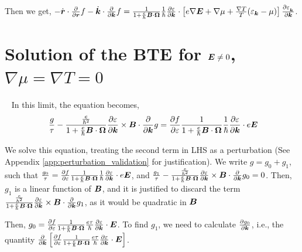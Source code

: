 \documentclass{report}
\renewcommand\vec[1]{\ensuremath\boldsymbol{#1}} %
\begin{document}
Then we get, $-\dot{\vec{r}} \cdot \frac{\partial }{\partial \vec{r}} f - \dot{\vec{k}} \cdot \frac{\partial}{\partial \vec{k}} f = \frac{1}{1 + \frac{e}{\hbar} \vec{B}\cdot\vec{\Omega}} \frac{1}{\hbar} \frac{\partial \varepsilon}{\partial \vec{k}} \cdot \left[e\nabla \vec{E} + \nabla \mu + \frac{\nabla T}{T} (\varepsilon_{\vec{k}} - \mu)\right] \frac{\partial \varepsilon_{_{\vec{k}}}}{\partial \vec{k}}$.


\section{Solution of the BTE for $\vec{E} \neq 0$, $\nabla \mu =  \nabla T = 0$}~\label{app:sec:BTE_sol_nonzeroE}
In this limit, the equation becomes,
\begin{equation}~\label{Eq:app:BTE_zero_chem_pot_thermal_gradient}
	\frac{g}{\tau} -\frac{\frac{e}{\hbar^2} }{1 + \frac{e}{\hbar} \vec{B} \cdot \vec{\Omega}} \frac{\partial \varepsilon}{\partial \vec{k}} \times \vec{B} \cdot\frac{\partial}{\partial \vec{k}} g = \frac{\partial f}{\partial \varepsilon}\frac{1}{1 + \frac{e}{\hbar} \vec{B}\cdot \vec{\Omega}}
	\frac{1}{\hbar} \frac{\partial \varepsilon}{\partial \vec{k}}\cdot e \vec{E}
\end{equation}

We solve this equation, treating the second term in LHS as a perturbation (See Appendix \ref{app:perturbation_validation} for justification).
We write $g = g_0 + g_1$, such that $\frac{g_0}{\tau} = \frac{\partial f}{\partial \varepsilon}\frac{1}{1 + \frac{e}{\hbar} \vec{B}\cdot\vec{\Omega}}
\frac{1}{\hbar} \frac{\partial \varepsilon}{\partial \vec{k}}\cdot e \vec{E}$, and $\frac{g_1}{\tau} -\frac{\frac{e}{\hbar^2} }{1 + \frac{e}{\hbar} \vec{B}\cdot\vec{\Omega}} \frac{\partial \varepsilon}{\partial \vec{k}} \times \vec{B} \cdot\frac{\partial}{\partial \vec{k}} g_0 = 0$.
Then, $g_1$ is a linear function of $\vec{B}$, and it is justified to discard the term $\frac{\frac{e}{\hbar^2} }{1 + \frac{e}{\hbar} \vec{B}\cdot\vec{\Omega}} \frac{\partial \varepsilon}{\partial \vec{k}} \times \vec{B} \cdot\frac{\partial}{\partial \vec{k}} g_1$, as it would be quadratic in $\vec{B}$


Then, ${g_0} = \frac{\partial f} {\partial \varepsilon}\frac{1}{1 + \frac{e}{\hbar} \vec{B}\cdot\vec{\Omega}}
\frac{e \tau}{\hbar} \frac{\partial \varepsilon}{\partial \vec{k}}\cdot \vec{E}$. To find $g_1$, we need to calculate $\frac{\partial g_0}{\partial \vec{k}}$, i.e., the quantity 
$\frac{\partial}{\partial \vec{k}} \left[ \frac{\partial f} {\partial \varepsilon}\frac{1}{1 + \frac{e}{\hbar} \vec{B}\cdot\vec{\Omega}}
\frac{e \tau}{\hbar} \frac{\partial \varepsilon}{\partial \vec{k}}\cdot \vec{E} \right]$.
\end{document}
